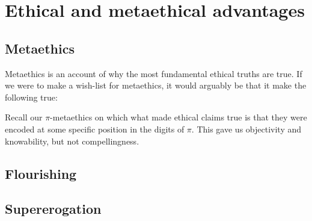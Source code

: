 \def\mychapter{III}
\chapter{Ethical and metaethical advantages}\label{ch:meta}
\section{Metaethics}
Metaethics is an account of why the most fundamental ethical truths are true. If we were to make a wish-list
for metaethics, it would arguably be that it make the following true:

Recall our $\pi$-metaethics on which what made ethical claims true is that they were encoded at some
specific position in the digits of $\pi$. This gave us objectivity and knowability, 
but not compellingness.

\section{Flourishing}
\section{Supererogation}
\chaptertail